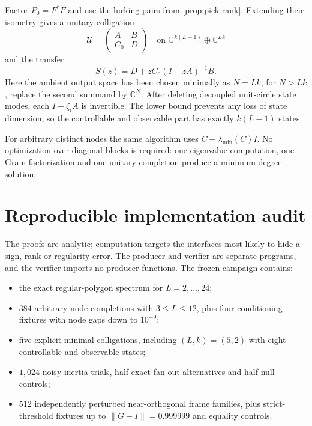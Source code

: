 \documentclass[11pt]{article}
\theoremstyle{definition}
\theoremstyle{remark}
\newcommand{\C}{\mathbb C}
\newcommand{\norm}[1]{\lVert#1\rVert}
\begin{document}
Factor $P_0=F^*F$ and use the lurking pairs from
\cref{prop:pick-rank}.  Extending their isometry gives a unitary colligation
\[
                 \mathcal U=\begin{pmatrix}A&B\\C_0&D\end{pmatrix}
                 \quad\text{on }\C^{k(L-1)}\oplus\C^{Lk}
\]
and the transfer
\begin{equation}\label{eq:transfer}
                    S(z)=D+zC_0(I-zA)^{-1}B.
\end{equation}
Here the ambient output space has been chosen minimally as $N=Lk$; for
$N>Lk$, replace the second summand by $\C^N$.  After deleting decoupled
unit-circle state modes, each $I-\zeta_iA$ is invertible.  The lower bound
prevents any loss of state dimension,
so the controllable and observable part has exactly $k(L-1)$ states.

For arbitrary distinct nodes the same algorithm uses
$C-\lambda_{\min}(C)I$.  No optimization over diagonal blocks is required:
one eigenvalue computation, one Gram factorization and one unitary completion
produce a minimum-degree solution.

\section{Reproducible implementation audit}

The proofs are analytic; computation targets the interfaces most likely to
hide a sign, rank or regularity error.  The producer and verifier are separate
programs, and the verifier imports no producer functions.  The frozen
campaign contains:
\begin{itemize}
 \item the exact regular-polygon spectrum for $L=2,\ldots,24$;
 \item $384$ arbitrary-node completions with $3\le L\le12$, plus four
conditioning fixtures with node gaps down to $10^{-9}$;
 \item five explicit minimal colligations, including $(L,k)=(5,2)$ with
 eight controllable and observable states;
 \item $1{,}024$ noisy inertia trials, half exact fan-out alternatives and
 half null controls;
 \item $512$ independently perturbed near-orthogonal frame families, plus
strict-threshold fixtures up to $\norm{G-I}=0.999999$ and equality controls.
\end{itemize}
\end{document}
